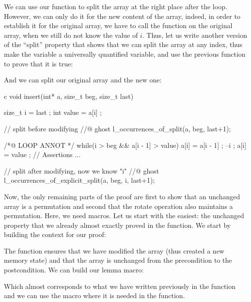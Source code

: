 We can use our function to split the array at the right place after the loop.
However, we can only do it for the new content of the array, indeed, in order to
establish it for the original array, we have to call the function on the
original array, when we still do not know the value of $i$. Thus, let us write
another version of the ``split'' property that shows that we can split the
array at any index, thus make the  variable a universally
quantified variable, and use the previous function to prove that it is true:




And we can split our original array and the new one:


\begin{CodeBlock}{c}
void insert(int* a, size_t beg, size_t last){
  size_t i = last ;
  int value = a[i] ;

  // split before modifying
  //@ ghost l_occurrences_of_split(a, beg, last+1);

  /*@ LOOP ANNOT */
  while(i > beg && a[i - 1] > value){
    a[i] = a[i - 1] ;
    --i ;
  }
  a[i] = value ;
  // Assertions ...

  // split after modifying, now we know "i"
  //@ ghost l_occurrences_of_explicit_split(a, beg, i, last+1);
}
\end{CodeBlock}


Now, the only remaining parts of the proof are first to show that an unchanged
array is a permutation and second that the rotate operation also maintains a
permutation. Here, we need macros. Let us start with the easiest: the unchanged
property that we already almost exactly proved in the
 function. We start by building the context for our
proof:




The function  ensures that we have
modified the array (thus created a new memory state) and that the array is
unchanged from the precondition to the postcondition. We can build our
lemma macro:




Which almost corresponds to what we have written previously in the
 function and we can use the macro where it is needed
in the  function.




